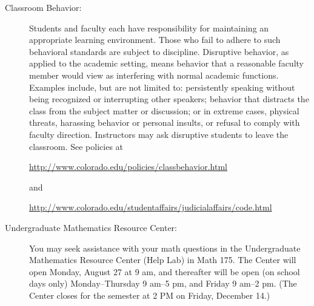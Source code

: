 \documentclass[11pt]{article}
\begin{document}
\begin{description}
\item[Classroom Behavior:] Students and faculty each have
  responsibility for maintaining an appropriate learning
  environment. Those who fail to adhere to such behavioral standards
  are subject to discipline.  Disruptive behavior, as applied to the
  academic setting, means behavior that a reasonable faculty member
  would view as interfering with normal academic functions. Examples
  include, but are not limited to: persistently speaking without being
  recognized or interrupting other speakers; behavior that distracts
  the class from the subject matter or discussion; or in extreme
  cases, physical threats, harassing behavior or personal insults, or
  refusal to comply with faculty direction. Instructors may ask
  disruptive students to leave the classroom.  See policies at
  \begin{center}
    \url{http://www.colorado.edu/policies/classbehavior.html}    
  \end{center}
  and
  \begin{center}
    \url{http://www.colorado.edu/studentaffairs/judicialaffairs/code.html}
  \end{center}

\item[Undergraduate Mathematics Resource Center:] You may seek
  assistance with your math questions in the Undergraduate Mathematics
  Resource Center (Help Lab) in Math 175.  The Center will open
  Monday, August 27 at 9 am, and thereafter will be open (on school
  days only) Monday--Thursday 9 am--5 pm, and Friday 9 am--2 pm.  (The
  Center closes for the semester at 2 PM on Friday, December 14.)

\end{description}
\end{document}
